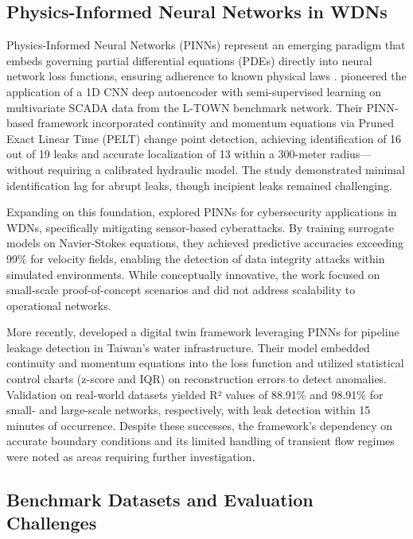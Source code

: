 \documentclass[final,5p,times,twocolumn,authoryear]{elsarticle}
\begin{document}
\subsection{Physics-Informed Neural Networks in WDNs}

Physics-Informed Neural Networks (PINNs) represent an emerging paradigm that embeds governing partial differential equations (PDEs) directly into neural network loss functions, ensuring adherence to known physical laws \cite{RAISSI2019686}. \cite{TORNYEVIADZI2023106062} pioneered the application of a 1D CNN deep autoencoder with semi-supervised learning on multivariate SCADA data from the L-TOWN benchmark network. Their PINN-based framework incorporated continuity and momentum equations via Pruned Exact Linear Time (PELT) change point detection, achieving identification of 16 out of 19 leaks and accurate localization of 13 within a 300-meter radius—without requiring a calibrated hydraulic model. The study demonstrated minimal identification lag for abrupt leaks, though incipient leaks remained challenging.

Expanding on this foundation, \cite{falas2020pinnwatersecurity} explored PINNs for cybersecurity applications in WDNs, specifically mitigating sensor-based cyberattacks. By training surrogate models on Navier-Stokes equations, they achieved predictive accuracies exceeding 99\% for velocity fields, enabling the detection of data integrity attacks within simulated environments. While conceptually innovative, the work focused on small-scale proof-of-concept scenarios and did not address scalability to operational networks.

More recently, \cite{lin2025digitaltwin} developed a digital twin framework leveraging PINNs for pipeline leakage detection in Taiwan's water infrastructure. Their model embedded continuity and momentum equations into the loss function and utilized statistical control charts (z-score and IQR) on reconstruction errors to detect anomalies. Validation on real-world datasets yielded R² values of 88.91\% and 98.91\% for small- and large-scale networks, respectively, with leak detection within 15 minutes of occurrence. Despite these successes, the framework's dependency on accurate boundary conditions and its limited handling of transient flow regimes were noted as areas requiring further investigation.



\subsection{Benchmark Datasets and Evaluation Challenges}
\end{document}
